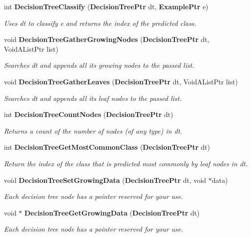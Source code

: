 \begin{CompactItemize}
int {\bf Decision\-Tree\-Classify} ({\bf Decision\-Tree\-Ptr} dt, {\bf Example\-Ptr} e)
\begin{CompactList}\small\item\em Uses dt to classify e and returns the index of the predicted class. \item\end{CompactList}\item 
void {\bf Decision\-Tree\-Gather\-Growing\-Nodes} ({\bf Decision\-Tree\-Ptr} dt, Void\-AList\-Ptr list)
\begin{CompactList}\small\item\em Searches dt and appends all its growing nodes to the passed list. \item\end{CompactList}\item 
void {\bf Decision\-Tree\-Gather\-Leaves} ({\bf Decision\-Tree\-Ptr} dt, Void\-AList\-Ptr list)
\begin{CompactList}\small\item\em Searches dt and appends all its leaf nodes to the passed list. \item\end{CompactList}\item 
int {\bf Decision\-Tree\-Count\-Nodes} ({\bf Decision\-Tree\-Ptr} dt)
\begin{CompactList}\small\item\em Returns a count of the number of nodes (of any type) in dt. \item\end{CompactList}\item 
int {\bf Decision\-Tree\-Get\-Most\-Common\-Class} ({\bf Decision\-Tree\-Ptr} dt)
\begin{CompactList}\small\item\em Return the index of the class that is predicted most commonly by leaf nodes in dt. \item\end{CompactList}\item 
void {\bf Decision\-Tree\-Set\-Growing\-Data} ({\bf Decision\-Tree\-Ptr} dt, void $\ast$data)
\begin{CompactList}\small\item\em Each decision tree node has a pointer reserved for your use. \item\end{CompactList}\item 
void $\ast$ {\bf Decision\-Tree\-Get\-Growing\-Data} ({\bf Decision\-Tree\-Ptr} dt)
\begin{CompactList}\small\item\em Each decision tree node has a pointer reserved for your use. \item\end{CompactList}\item 

\end{CompactItemize}
